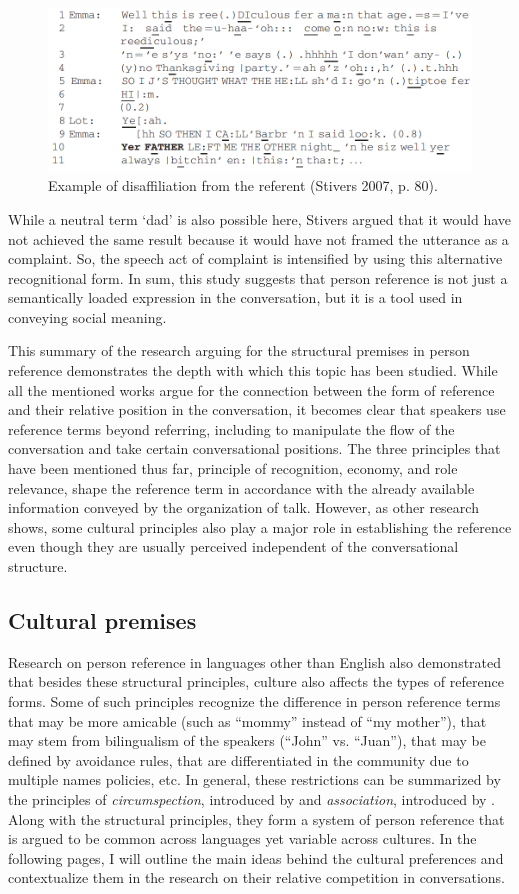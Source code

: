 \documentclass[12pt]{article}
\begin{document}
\begin{figure}[h]
\caption{Example of disaffiliation from the referent (Stivers 2007, p. 80).}
\label{stivers}
\includegraphics[width=5in]{stivers.png}
\end{figure}
While a neutral term `dad' is also possible here, Stivers argued that it would have not achieved the same result because it would have not framed the utterance as a complaint. So, the speech act of complaint is intensified by using this alternative recognitional form. In sum, this study suggests that person reference is not just a semantically loaded expression in the conversation, but it is a tool used in conveying social meaning. 

This summary of the research arguing for the structural premises in person reference demonstrates the depth with which this topic has been studied. While all the mentioned works argue for the connection between the form of reference and their relative position in the conversation, it becomes clear that speakers use reference terms beyond referring, including to manipulate the flow of the conversation and take certain conversational positions. The three principles that have been mentioned thus far, principle of recognition, economy, and role relevance, shape the reference term in accordance with the already available information conveyed by the organization of talk. However, as other research shows, some cultural principles also play a major role in establishing the reference even though they are usually perceived independent of the conversational structure. 
\subsection{Cultural premises}
Research on person reference in languages other than English also demonstrated that besides these structural principles, culture also affects the types of reference forms. Some of such principles recognize the difference in person reference terms that may be more amicable (such as ``mommy'' instead of ``my mother''), that may stem from bilingualism of the speakers (``John'' vs. ``Juan''), that may be defined by avoidance rules, that are differentiated in the community due to multiple names policies, etc. In general, these restrictions can be summarized by the principles of \textit{circumspection}, introduced by \textcite{levinson2007} and \textit{association}, introduced by \textcite{brown2007}. Along with the structural principles, they form a system of person reference that is argued to be common across languages yet variable across cultures. In the following pages, I will outline the main ideas behind the cultural preferences and contextualize them in the research on their relative competition in conversations.  
\end{document}
